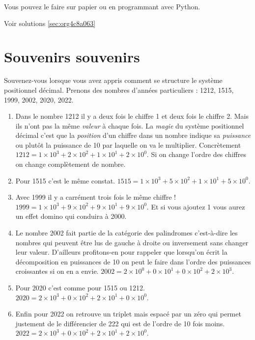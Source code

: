 \documentclass[a4paper, 11pt, twoside]{book}
\begin{document}
Vous pouvez le faire sur papier ou en programmant avec Python.

Voir solutions \ref{sec:org4c8a063}

\section{Souvenirs souvenirs}
\label{sec:org7ab47a1}

Souvenez-vous lorsque vous avez appris comment se structure le
système positionnel décimal. Prenons des nombres d'années
particuliers : 1212, 1515, 1999, 2002, 2020, 2022.

\begin{enumerate}
\item Dans le nombre 1212 il y a deux fois le chiffre 1 et deux fois
le chiffre 2. Mais ils n'ont pas la même \emph{valeur} à chaque
fois. La \emph{magie} du système positionnel décimal c'est que la
\emph{position} d'un chiffre dans un nombre indique sa \emph{puissance}
ou plutôt la puissance de 10 par laquelle on va le
multiplier. Concrètement \(1212 = 1\times 10^3 + 2\times 10^2 +
       1\times 10^1 + 2\times 10^0\). Si on change l'ordre des chiffres
on change complètement de nombre.
\item Pour 1515 c'est le même constat. \(1515 = 1\times 10^3 + 5\times
       10^2 + 1\times 10^1 + 5\times 10^0\).
\item Avec 1999 il y a carrément trois fois le même chiffre ! \(1999 =
       1\times 10^3 + 9\times 10^2 + 9\times 10^1 + 9\times 10^0\). Et
si vous ajoutez 1 vous aurez un effet domino qui conduira
à 2000.
\item Le nombre 2002 fait partie de la catégorie des palindromes
c'est-à-dire les nombres qui peuvent être lus de gauche à
droite ou inversement sans changer leur valeur. D'ailleurs
profitons-en pour rappeler que lorsqu'on écrit la décomposition
en puissances de 10 on peut le faire dans l'ordre des
puissances croissantes si on en a envie. \(2002 = 2\times 10^0 +
       0\times 10^1 + 0\times 10^2 + 2\times 10^3\).
\item Pour 2020 c'est comme pour 1515 ou 1212. \(2020 = 2\times 10^3 +
       0\times 10^2 + 2\times 10^1 + 0\times 10^0\).
\item Enfin pour 2022 on retrouve un triplet mais espacé par un zéro
qui permet justement de le différencier de 222 qui est de
l'ordre de 10 fois moins. \(2022 = 2\times 10^3 + 0\times 10^2 +
       2\times 10^1 + 2\times 10^0\).
\end{enumerate}
\end{document}
